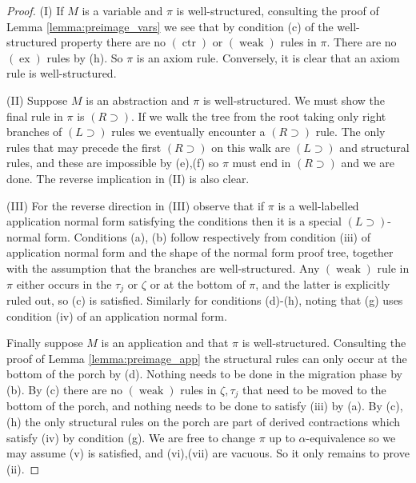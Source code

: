 \documentclass[english,letter paper,12pt,leqno]{article}
\theoremstyle{example}
\numberwithin{equation}{section}
\def\imp{\supset}
\begin{document}
\begin{proof}
(I) If $M$ is a variable and $\pi$ is well-structured, consulting the proof of Lemma \ref{lemma:preimage_vars} we see that by condition (c) of the well-structured property there are no $(\operatorname{ctr})$ or $(\operatorname{weak})$ rules in $\pi$. There are no $(\operatorname{ex})$ rules by (h). So $\pi$ is an axiom rule. Conversely, it is clear that an axiom rule is well-structured. 

(II) Suppose $M$ is an abstraction and $\pi$ is well-structured. We must show the final rule in $\pi$ is $(R \imp)$. If we walk the tree from the root taking only right branches of $(L \imp)$ rules we eventually encounter a $(R \imp)$ rule. The only rules that may precede the first $(R \imp)$ on this walk are $(L \imp)$ and structural rules, and these are impossible by (e),(f) so $\pi$ must end in $(R \imp)$ and we are done. The reverse implication in (II) is also clear.

(III) For the reverse direction in (III) observe that if $\pi$ is a well-labelled application normal form satisfying the conditions then it is a special $(L \imp)$-normal form. Conditions (a), (b) follow respectively from condition (iii) of application normal form and the shape of the normal form proof tree, together with the assumption that the branches are well-structured. Any $(\operatorname{weak})$ rule in $\pi$ either occurs in the $\tau_j$ or $\zeta$ or at the bottom of $\pi$, and the latter is explicitly ruled out, so (c) is satisfied. Similarly for conditions (d)-(h), noting that (g) uses condition (iv) of an application normal form.

Finally suppose $M$ is an application and that $\pi$ is well-structured. Consulting the proof of Lemma \ref{lemma:preimage_app} the structural rules can only occur at the bottom of the porch by (d). Nothing needs to be done in the migration phase by (b). By (c) there are no $(\operatorname{weak})$ rules in $\zeta, \tau_j$ that need to be moved to the bottom of the porch, and nothing needs to be done to satisfy (iii) by (a). By (c),(h) the only structural rules on the porch are part of derived contractions which satisfy (iv) by condition (g). We are free to change $\pi$ up to $\alpha$-equivalence so we may assume (v) is satisfied, and (vi),(vii) are vacuous. So it only remains to prove (ii).


\end{proof}
\end{document}
